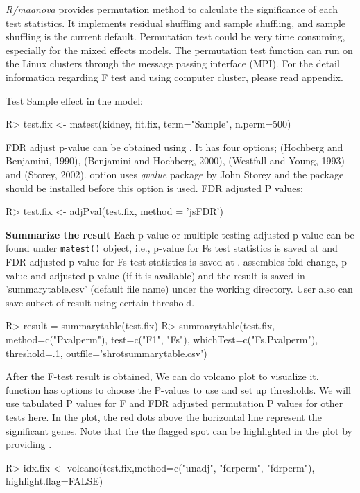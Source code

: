 {\em R/maanova} provides permutation method to calculate the significance of
each test statistics. It implements residual shuffling and sample shuffling,
and sample shuffling is the current default. Permutation test could be very
time consuming, especially for the mixed effects models. The permutation
test function can run on the Linux clusters through the message passing 
interface (MPI). For the detail information regarding F test and 
using computer cluster, please read appendix. 

Test Sample effect in the model:
\begin{Sinput}
R> test.fix <- matest(kidney, fit.fix, term="Sample", n.perm=500)
\end{Sinput}

FDR adjust p-value can be obtained using . It has four
  options;   (Hochberg and Benjamini, 1990),  (Benjamini and Hochberg, 2000), 
  (Westfall and Young, 1993) and  (Storey,
  2002).  option uses {\em qvalue} package by John
  Storey and the package should be installed before this option
  is used. FDR adjusted P values:
\begin{Sinput}
R> test.fix <- adjPval(test.fix, method = 'jsFDR')
\end{Sinput}
{\bf Summarize the result} Each p-value or multiple testing adjusted p-value
can be found under {\tt matest()} object, i.e., p-value for Fs test statistics is
saved at  and FDR adjusted p-value for Fs
test statistics is saved at .  assembles
fold-change, p-value and adjusted p-value (if it is available) and the result
is saved in 'summarytable.csv' (default file name) under the working directory. User also can save subset of result using certain threshold.  
\begin{Sinput}
R> result = summarytable(test.fix)
R> summarytable(test.fix, method=c("Pvalperm"), test=c("F1", "Fs"),
whichTest=c("Fs.Pvalperm"), threshold=.1, outfile='shrotsummarytable.csv')
\end{Sinput}

After the F-test result is obtained, We can do volcano plot
to visualize it.  function has options to 
choose the P-values to use and set up thresholds. We will
use tabulated P values for F and FDR adjusted permutation 
P values for other tests here. 
In the plot, the red dots above the horizontal line represent
the significant genes. 
Note that the the flagged spot can be highlighted in the plot by providing .
\begin{Sinput}
R> idx.fix <- volcano(test.fix,method=c("unadj", "fdrperm", "fdrperm"),
         highlight.flag=FALSE)
\end{Sinput}

